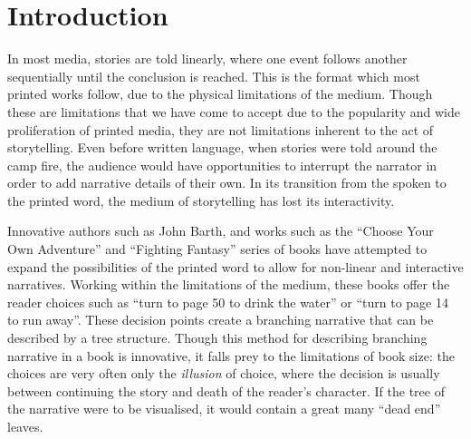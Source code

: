 \documentclass[11pt]{report}
\def\mnote#1{\todo[color=Goldenrod,size=\scriptsize]{Matt: #1}}
\begin{document}



\chapter{Introduction}
\label{cha:introduction}

In most media, stories are told linearly, where one event follows another
sequentially until the conclusion is reached. This is the format which most
printed works follow, due to the physical limitations of the medium. Though
these are limitations
that we have come to accept due to the popularity and wide proliferation of
printed media, they are not limitations inherent to the act of storytelling. Even
before written language, when stories were told around the camp fire, the
audience would have opportunities to interrupt the narrator in order to add
narrative details of their own. In its transition from the spoken to the printed
word, the medium of storytelling has lost its interactivity.

Innovative authors such as John Barth, and works such as the ``Choose Your Own Adventure'' and
``Fighting Fantasy'' series of books have attempted to expand the possibilities
of the printed word to allow for non-linear and interactive narratives. Working
within the limitations of the medium, these books offer the reader choices such
as ``turn to page 50 to drink the water'' or ``turn to page 14 to run away''.
These decision points create a branching narrative that can be described by a
tree structure. Though this method for describing branching narrative in a book
is innovative, it falls prey to the limitations of book size: the choices are
very often only the \emph{illusion} of choice, where the decision is usually
between continuing the story and death of the reader's character. If the tree of the narrative were to be
visualised, it would contain a great many ``dead end'' leaves.
\end{document}

